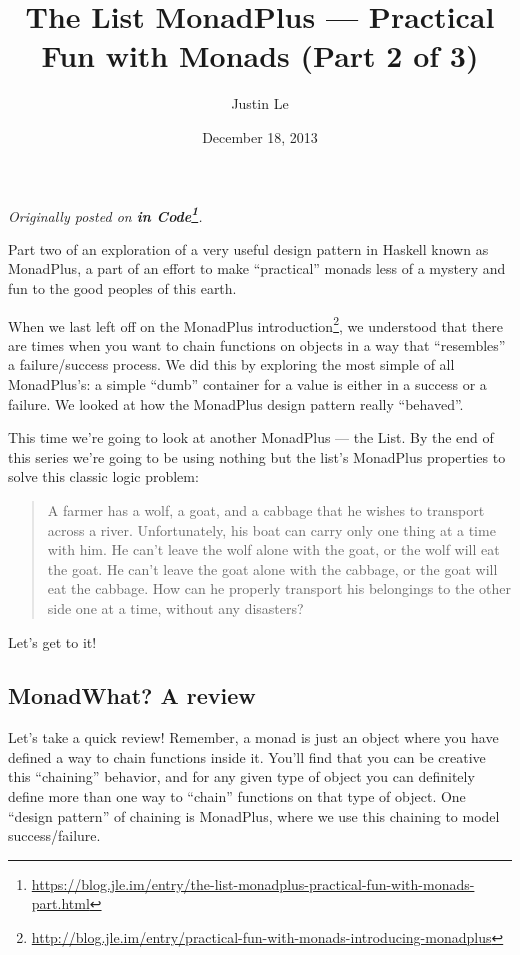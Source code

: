 \documentclass[]{article}
\title{The List MonadPlus --- Practical Fun with Monads (Part 2 of 3)}
\author{Justin Le}
\date{December 18, 2013}
\renewcommand{\href}[2]{#2\footnote{\url{#1}}}
\begin{document}
\maketitle

\emph{Originally posted on
\textbf{\href{https://blog.jle.im/entry/the-list-monadplus-practical-fun-with-monads-part.html}{in
Code}}.}

Part two of an exploration of a very useful design pattern in Haskell known as
MonadPlus, a part of an effort to make ``practical'' monads less of a mystery
and fun to the good peoples of this earth.

When we last left off on the
\href{http://blog.jle.im/entry/practical-fun-with-monads-introducing-monadplus}{MonadPlus
introduction}, we understood that there are times when you want to chain
functions on objects in a way that ``resembles'' a failure/success process. We
did this by exploring the most simple of all MonadPlus's: a simple ``dumb''
container for a value is either in a success or a failure. We looked at how the
MonadPlus design pattern really ``behaved''.

This time we're going to look at another MonadPlus --- the List. By the end of
this series we're going to be using nothing but the list's MonadPlus properties
to solve this classic logic problem:

\begin{quote}
A farmer has a wolf, a goat, and a cabbage that he wishes to transport across a
river. Unfortunately, his boat can carry only one thing at a time with him. He
can't leave the wolf alone with the goat, or the wolf will eat the goat. He
can't leave the goat alone with the cabbage, or the goat will eat the cabbage.
How can he properly transport his belongings to the other side one at a time,
without any disasters?
\end{quote}

Let's get to it!

\hypertarget{monadwhat-a-review}{%
\subsection{MonadWhat? A review}\label{monadwhat-a-review}}

Let's take a quick review! Remember, a monad is just an object where you have
defined a way to chain functions inside it. You'll find that you can be creative
this ``chaining'' behavior, and for any given type of object you can definitely
define more than one way to ``chain'' functions on that type of object. One
``design pattern'' of chaining is MonadPlus, where we use this chaining to model
success/failure.
\end{document}
